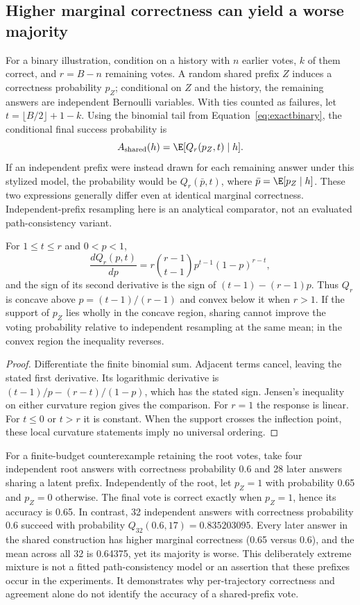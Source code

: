 \subsection{Higher marginal correctness can yield a worse majority}
For a binary illustration, condition on a history with $n$ earlier votes, $k$ of them correct, and $r=B-n$ remaining votes. A random shared prefix $Z$ induces a correctness probability $p_Z$; conditional on $Z$ and the history, the remaining answers are independent Bernoulli variables. With ties counted as failures, let $t=\lfloor B/2\rfloor+1-k$. Using the binomial tail from Equation~\ref{eq:exactbinary}, the conditional final success probability is
\begin{equation}
 A_{\mathrm{shared}}(h)=\E[Q_r(p_Z,t)\mid h].
 \label{eq:mixturevote}
\end{equation}
If an independent prefix were instead drawn for each remaining answer under this stylized model, the probability would be $Q_r(\bar p,t)$, where $\bar p=\E[p_Z\mid h]$. These two expressions generally differ even at identical marginal correctness. Independent-prefix resampling here is an analytical comparator, not an evaluated path-consistency variant.

\begin{proposition}
For $1\leq t\leq r$ and $0<p<1$,
\[
 \frac{d Q_r(p,t)}{dp}
 =r\binom{r-1}{t-1}p^{t-1}(1-p)^{r-t},
\]
and the sign of its second derivative is the sign of
$(t-1)-(r-1)p$. Thus $Q_r$ is concave above $p=(t-1)/(r-1)$ and convex below it when $r>1$. If the support of $p_Z$ lies wholly in the concave region, sharing cannot improve the voting probability relative to independent resampling at the same mean; in the convex region the inequality reverses.
\end{proposition}
\begin{proof}
Differentiate the finite binomial sum. Adjacent terms cancel, leaving the stated first derivative. Its logarithmic derivative is $(t-1)/p-(r-t)/(1-p)$, which has the stated sign. Jensen's inequality on either curvature region gives the comparison. For $r=1$ the response is linear. For $t\leq0$ or $t>r$ it is constant. When the support crosses the inflection point, these local curvature statements imply no universal ordering.
\end{proof}

For a finite-budget counterexample retaining the root votes, take four independent root answers with correctness probability 0.6 and 28 later answers sharing a latent prefix. Independently of the root, let $p_Z=1$ with probability 0.65 and $p_Z=0$ otherwise. The final vote is correct exactly when $p_Z=1$, hence its accuracy is 0.65. In contrast, 32 independent answers with correctness probability 0.6 succeed with probability $Q_{32}(0.6,17)=0.835203095$. Every later answer in the shared construction has higher marginal correctness (0.65 versus 0.6), and the mean across all 32 is 0.64375, yet its majority is worse. This deliberately extreme mixture is not a fitted path-consistency model or an assertion that these prefixes occur in the experiments. It demonstrates why per-trajectory correctness and agreement alone do not identify the accuracy of a shared-prefix vote.


